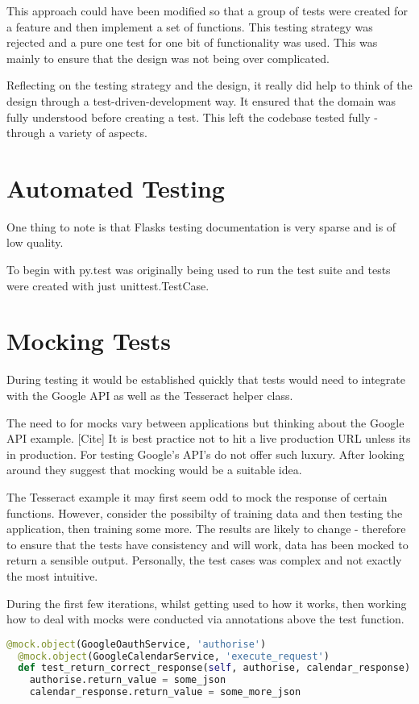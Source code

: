 This approach could have been modified so that a group of tests were created for a feature and then implement a set of functions. This testing strategy was rejected and a pure one test for one bit of functionality was used. This was mainly to ensure that the design was not being over complicated.

Reflecting on the testing strategy and the design, it really did help to think of the design through a test-driven-development way. It ensured that the domain was fully understood before creating a test. This left the codebase tested fully - through a variety of aspects.
\section{Automated Testing}
One thing to note is that Flasks testing documentation is very sparse and is of low quality.

To begin with py.test was originally being used to run the test suite and tests were created with just unittest.TestCase.

\section{Mocking Tests}
During testing it would be established quickly that tests would need to integrate with the Google API as well as the Tesseract helper class.

The need to for mocks vary between applications but thinking about the Google API example. [Cite] It is best practice not to hit a live production URL unless its in production. For testing Google's API's do not offer such luxury. After looking around they suggest that mocking would be a suitable idea.

The Tesseract example it may first seem odd to mock the response of certain functions. However, consider the possibilty of training data and then testing the application, then training some more. The results are likely to change - therefore to ensure that the tests have consistency and will work, data has been mocked to return a sensible output. Personally, the test cases was complex and not exactly the most intuitive.

During the first few iterations, whilst getting used to how it works, then working how to deal with mocks were conducted via annotations above the test function.

\begin{lstlisting}[language=python]
  @mock.object(GoogleOauthService, 'authorise')
  @mock.object(GoogleCalendarService, 'execute_request')
  def test_return_correct_response(self, authorise, calendar_response):
    authorise.return_value = some_json
    calendar_response.return_value = some_more_json
\end{lstlisting}

